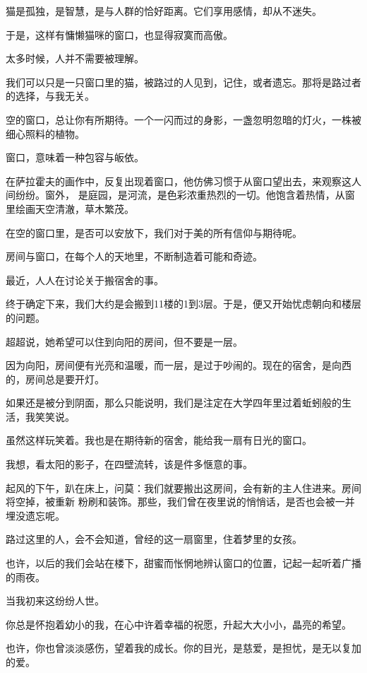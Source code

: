 \documentclass[12pt,a4paper]{article}
\begin{document}
		猫是孤独，是智慧，是与人群的恰好距离。它们享用感情，却从不迷失。

		于是，这样有慵懒猫咪的窗口，也显得寂寞而高傲。


		太多时候，人并不需要被理解。

		我们可以只是一只窗口里的猫，被路过的人见到，记住，或者遗忘。那将是路过者的选择，与我无关。

		空的窗口，总让你有所期待。一个一闪而过的身影，一盏忽明忽暗的灯火，一株被细心照料的植物。

		窗口，意味着一种包容与皈依。

		在萨拉霍夫的画作中，反复出现着窗口，他仿佛习惯于从窗口望出去，来观察这人间纷纷。窗外，
	是庭园，是河流，是色彩浓重热烈的一切。他饱含着热情，从窗里绘画天空清澈，草木繁茂。

		在空的窗口里，是否可以安放下，我们对于美的所有信仰与期待呢。\par
		房间与窗口，在每个人的天地里，不断制造着可能和奇迹。

		最近，人人在讨论关于搬宿舍的事。\par
		终于确定下来，我们大约是会搬到11楼的1到3层。于是，便又开始忧虑朝向和楼层的问题。\par
		超超说，她希望可以住到向阳的房间，但不要是一层。\par
		因为向阳，房间便有光亮和温暖，而一层，是过于吵闹的。现在的宿舍，是向西的，房间总是要开灯。\par
		如果还是被分到阴面，那么只能说明，我们是注定在大学四年里过着蚯蚓般的生活，我笑笑说。

		虽然这样玩笑着。我也是在期待新的宿舍，能给我一扇有日光的窗口。\par
		我想，看太阳的影子，在四壁流转，该是件多惬意的事。

		起风的下午，趴在床上，问莫：我们就要搬出这房间，会有新的主人住进来。房间将空掉，被重新
	粉刷和装饰。那些，我们曾在夜里说的悄悄话，是否也会被一并埋没遗忘呢。

		路过这里的人，会不会知道，曾经的这一扇窗里，住着梦里的女孩。

		也许，以后的我们会站在楼下，甜蜜而怅惘地辨认窗口的位置，记起一起听着广播的雨夜。

	\endwriting



		当我初来这纷纷人世。\par
		你总是怀抱着幼小的我，在心中许着幸福的祝愿，升起大大小小，晶亮的希望。\par
		也许，你也曾淡淡感伤，望着我的成长。你的目光，是慈爱，是担忧，是无以复加的爱。
\end{document}
